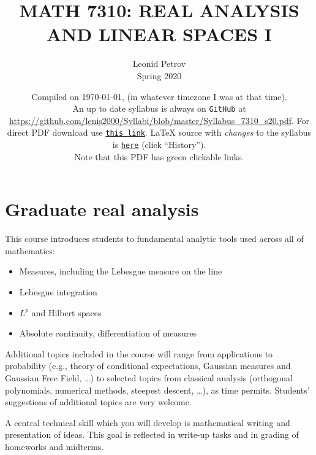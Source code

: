 \documentclass[oneside,11pt]{amsart}
\begin{document}
\title[MATH 7310: REAL ANALYSIS AND LINEAR SPACES I]{MATH 7310: REAL ANALYSIS AND LINEAR SPACES I}
\author{Leonid Petrov\\Spring 2020}
\date{Compiled on \today, \currenttime{} (in whatever timezone I was at that time).\\An up to date syllabus is always on \texttt{GitHub} at \url{https://github.com/lenis2000/Syllabi/blob/master/Syllabus_7310_s20.pdf}. For direct PDF download use \href{https://github.com/lenis2000/Syllabi/raw/master/Syllabus_7310_s20.pdf}{\texttt{this link}}.
	\LaTeX{} source with \textit{changes} to the syllabus is \href{https://github.com/lenis2000/Syllabi/blob/master/Syllabus_7310_s20.tex}{\texttt{here}}
(click ``History'').
\\Note that this PDF has green clickable links.}
\maketitle

\bigskip

\section{Graduate real analysis}
\bigskip

This course introduces students to fundamental analytic tools used across all of mathematics:
\begin{itemize}
	\item Measures, including the Lebesgue measure on the line
	\item Lebesgue integration
	\item $L^p$ and Hilbert spaces
	\item Absolute continuity, differentiation of measures
\end{itemize}

Additional topics included in the course will range from applications to
probability (e.g., theory of conditional expectations, Gaussian measures and Gaussian Free Field, \ldots)
to selected topics from classical analysis (orthogonal polynomials, numerical methods, steepest descent, \ldots),
as time permits.
Students' suggestions of additional topics are very welcome.

A central technical skill which you will develop is mathematical writing
and presentation of ideas. This goal is reflected in write-up tasks and
in grading of homeworks and midterms.
\end{document}
